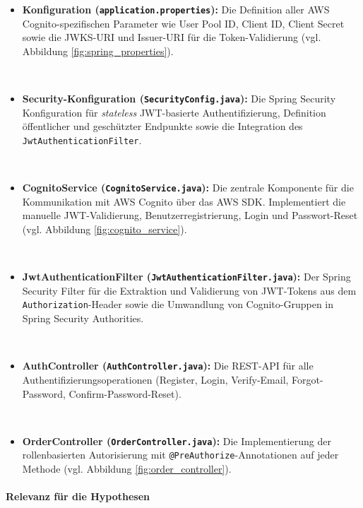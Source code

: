 \begin{itemize}
    \item \textbf{Konfiguration (\texttt{application.properties}):} Die Definition aller \ac{AWS} Cognito-spezifischen Parameter wie User Pool ID, Client ID, Client Secret sowie die \ac{JWKS}-\ac{URI} und Issuer-\ac{URI} für die Token-Validierung (vgl. Abbildung \ref{fig:spring_properties}).

    \item \textbf{Security-Konfiguration (\texttt{SecurityConfig.java}):} Die Spring Security Konfiguration für \textit{stateless} \ac{JWT}-basierte Authentifizierung, Definition öffentlicher und geschützter Endpunkte sowie die Integration des \texttt{JwtAuthenticationFilter}.

    \item \textbf{CognitoService (\texttt{CognitoService.java}):} Die zentrale Komponente für die Kommunikation mit \ac{AWS} Cognito über das \ac{AWS} \ac{SDK}. Implementiert die manuelle \ac{JWT}-Validierung, Benutzerregistrierung, Login und Passwort-Reset (vgl. Abbildung \ref{fig:cognito_service}).

    \item \textbf{JwtAuthenticationFilter (\texttt{JwtAuthenticationFilter.java}):} Der Spring Security Filter für die Extraktion und Validierung von \ac{JWT}-Tokens aus dem \texttt{Authorization}-Header sowie die Umwandlung von Cognito-Gruppen in Spring Security Authorities.

    \item \textbf{AuthController (\texttt{AuthController.java}):} Die REST-\ac{API} für alle Authentifizierungsoperationen (Register, Login, Verify-Email, Forgot-Password, Confirm-Password-Reset).

    \item \textbf{OrderController (\texttt{OrderController.java}):} Die Implementierung der rollenbasierten Autorisierung mit \texttt{@PreAuthorize}-Annotationen auf jeder Methode (vgl. Abbildung \ref{fig:order_controller}).
\end{itemize}

\paragraph{Relevanz für die Hypothesen}

